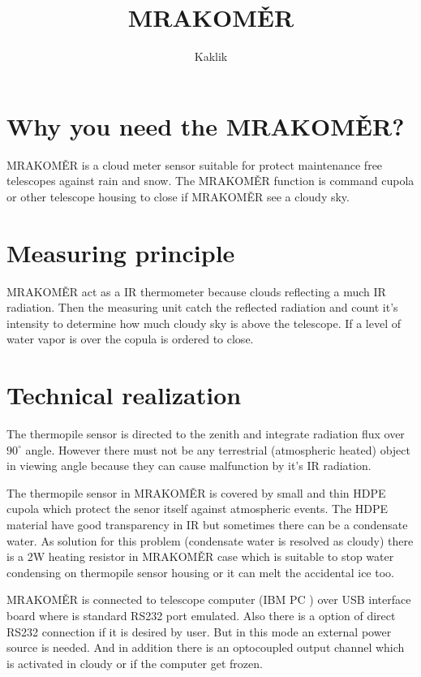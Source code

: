 \documentclass[10pt,a4paper]{article}
\title{MRAKOMĚR}
\author{Kaklik}
\begin{document}
\maketitle
\tableofcontents

\newpage

\section{Why you need the MRAKOMĚR?}
MRAKOMĚR is a cloud meter sensor suitable for protect maintenance free telescopes against rain and snow. The MRAKOMĚR function is command cupola or other telescope housing to close if MRAKOMĚR see a cloudy sky. 

\section{Measuring principle}
MRAKOMĚR act as a IR thermometer because clouds reflecting a much IR radiation. Then the measuring unit catch the reflected radiation and count it's intensity to determine how much cloudy sky is above the telescope. If a level of water vapor is over the copula is ordered to close. 

\section{Technical realization}
The thermopile sensor is directed  to the zenith and integrate radiation flux over $90^\circ$ angle. However there must not be any terrestrial (atmospheric  heated) object in viewing  angle because they can cause malfunction by it's IR radiation.        

The thermopile sensor in MRAKOMĚR  is covered by small and thin HDPE cupola which protect the senor itself against atmospheric events. The HDPE material have good transparency in IR but sometimes there can be a condensate water. As solution for this problem (condensate water is resolved as cloudy) there is a 2W heating resistor in MRAKOMĚR case which is suitable to stop water condensing on thermopile sensor housing or it can melt the accidental ice too. 

MRAKOMĚR is connected to telescope computer (IBM PC ) over USB interface  board where is standard RS232 port emulated. Also there is a option of direct RS232 connection if it is desired by user. But in this mode an external power source is needed. And in addition there is an optocoupled output channel which is activated in cloudy or if the computer get frozen.
\end{document}
